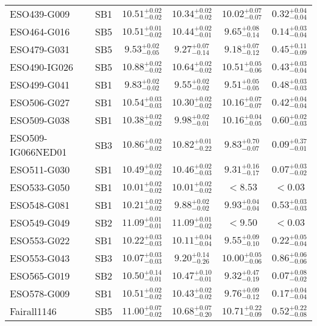 \documentclass[onecolumn]{mn2e}
\begin{document}
{\begin{center}
\begin{longtable}{lccccc}
ESO439-G009 & SB1 & $10.51_{-0.02}^{+0.02}$ & $10.34_{-0.02}^{+0.02}$ & $10.02_{-0.07}^{+0.07}$ &$0.32_{-0.04}^{+0.04}$ \\
ESO464-G016 & SB5 & $10.51_{-0.02}^{+0.01}$ & $10.44_{-0.01}^{+0.02}$ & $9.65_{-0.14}^{+0.08}$ &$0.14_{-0.04}^{+0.03}$ \\
ESO479-G031 & SB5 & $9.53_{-0.05}^{+0.02}$ & $9.27_{-0.14}^{+0.07}$ & $9.18_{-0.12}^{+0.07}$ &$0.45_{-0.09}^{+0.11}$ \\
ESO490-IG026 & SB5 & $10.88_{-0.02}^{+0.02}$ & $10.64_{-0.02}^{+0.02}$ & $10.51_{-0.06}^{+0.05}$ &$0.43_{-0.04}^{+0.03}$ \\
ESO499-G041 & SB1 & $9.83_{-0.02}^{+0.02}$ & $9.55_{-0.02}^{+0.02}$ & $9.51_{-0.05}^{+0.05}$ &$0.48_{-0.03}^{+0.03}$ \\
ESO506-G027 & SB1 & $10.54_{-0.03}^{+0.03}$ & $10.30_{-0.02}^{+0.02}$ & $10.16_{-0.07}^{+0.07}$ &$0.42_{-0.04}^{+0.04}$ \\
ESO509-G038 & SB1 & $10.38_{-0.02}^{+0.02}$ & $9.98_{-0.01}^{+0.02}$ & $10.16_{-0.05}^{+0.04}$ &$0.60_{-0.03}^{+0.02}$ \\
ESO509-IG066NED01 & SB3 & $10.86_{-0.02}^{+0.02}$ & $10.82_{-0.22}^{+0.01}$ & $9.83_{-0.07}^{+0.70}$ &$0.09_{-0.01}^{+0.37}$ \\
ESO511-G030 & SB1 & $10.49_{-0.02}^{+0.02}$ & $10.46_{-0.03}^{+0.02}$ & $9.31_{-0.17}^{+0.16}$ &$0.07_{-0.02}^{+0.03}$ \\
ESO533-G050 & SB1 & $10.01_{-0.02}^{+0.02}$ & $10.01_{-0.02}^{+0.02}$ & $<8.53$ &$<0.03$ \\
ESO548-G081 & SB1 & $10.21_{-0.02}^{+0.02}$ & $9.88_{-0.02}^{+0.02}$ & $9.93_{-0.04}^{+0.04}$ &$0.53_{-0.03}^{+0.03}$ \\
ESO549-G049 & SB2 & $11.09_{-0.01}^{+0.01}$ & $11.09_{-0.02}^{+0.01}$ & $<9.50$ &$<0.03$ \\
ESO553-G022 & SB1 & $10.22_{-0.03}^{+0.03}$ & $10.11_{-0.04}^{+0.04}$ & $9.55_{-0.10}^{+0.09}$ &$0.22_{-0.04}^{+0.05}$ \\
ESO553-G043 & SB3 & $10.07_{-0.03}^{+0.03}$ & $9.20_{-0.26}^{+0.14}$ & $10.00_{-0.06}^{+0.05}$ &$0.86_{-0.06}^{+0.06}$ \\
ESO565-G019 & SB2 & $10.50_{-0.01}^{+0.14}$ & $10.47_{-0.01}^{+0.10}$ & $9.32_{-0.19}^{+0.47}$ &$0.07_{-0.02}^{+0.08}$ \\
ESO578-G009 & SB1 & $10.51_{-0.02}^{+0.02}$ & $10.43_{-0.02}^{+0.02}$ & $9.76_{-0.12}^{+0.09}$ &$0.17_{-0.04}^{+0.04}$ \\
Fairall1146 & SB5 & $11.00_{-0.02}^{+0.07}$ & $10.68_{-0.20}^{+0.07}$ & $10.71_{-0.09}^{+0.22}$ &$0.52_{-0.08}^{+0.22}$ \\

\end{longtable}
\end{center}}
\end{document}
